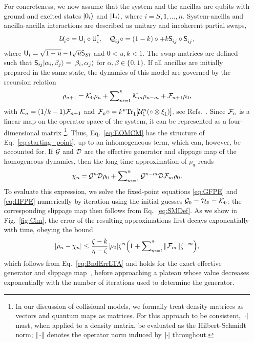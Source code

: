 \documentclass[aps,prl,reprint]{revtex4-2}
\begin{document}
For concreteness, we now assume that the system and the ancillas are qubits with ground and excited states $\lvert 0_i \rangle$ and $\lvert 1_i \rangle$, where $i=S,1,\dots,n$.
System-ancilla and ancilla-ancilla interactions are described as unitary and incoherent partial swaps,
\begin{equation}
	\mathcal{U}_i^{\vphantom{\dagger}}\circ = \mathsf{U}_i^{\vphantom{\dagger}}\circ\mathsf{U}_i^\dagger, \quad
	\mathcal{Q}_{ij}^{\vphantom{\dagger}}\circ= (1-k)\circ
		+ k\mathsf{S}_{ij}^{\vphantom{\dagger}}\circ\mathsf{S}_{ij}^{\vphantom{\dagger}},
\end{equation}
where $\mathsf{U}_i = \sqrt{1-u} - \mathrm{i} \sqrt{u}\mathsf{S}_{Si}$ and $0<u,k<1$.
The swap matrices are defined such that $\mathsf{S}_{ij}\lvert \alpha_i,\beta_j \rangle = \lvert \beta_i,\alpha_j \rangle$ for $\alpha,\beta\in\{0,1\}$.
If all ancillas are initially prepared in the same state, the dynamics of this model are governed by the recursion relation
\begin{equation}\label{eq:EOMCM}
	\rho_{n+1} = \mathcal{K}_0 \rho_n + \sum\nolimits_{m=1}^n \mathcal{K}_{m}\rho_{n-m} + \mathcal{F}_{n+1}\rho_0,
\end{equation}
with $\mathcal{K}_n = (1/k-1)\mathcal{F}_{n+1}$ and $\mathcal{F}_n\circ = k^n\mathrm{Tr}_1^{\vphantom{n}}[\mathcal{U}^n_1(\circ\otimes\xi_1^{\vphantom{n}})]$, see Refs.~\cite{meyerWeakMemoryDynamicsDiscrete2025,ciccarelloQuantumCollisionModels2022}.
Since $\mathcal{F}_n$ is a linear map on the operator space of the system, it can be represented as a four-dimensional matrix \footnote{In our discussion of collisional models, we formally treat density matrices as vectors and quantum maps as matrices.
For this approach to be consistent, $\lvert \cdot \rvert$ must, when applied to a density matrix, be evaluated as the Hilbert-Schmidt norm; $\lVert \cdot \rVert$ denotes the operator norm induced by $\lvert \cdot \rvert$ throughout.}.
Thus, Eq.~\eqref{eq:EOMCM} has the structure of Eq.~\eqref{eq:starting_point}, up to an inhomogeneous term, which can, however, be accounted for.
If $\mathcal{G}$ and $\mathcal{D}$ are the effective generator and slippage map of the homogeneous dynamics, then the long-time approximation of $\rho_n$ reads~\cite{meyerWeakMemoryDynamicsDiscrete2025}
\begin{equation}\label{eq:LTACM}
	\chi_n = \mathcal{G}^n\mathcal{D}\rho_0 + \sum\nolimits_{m=1}^n\mathcal{G}^{n-m}\mathcal{D}\mathcal{F}_m\rho_0.
\end{equation}
To evaluate this expression, we solve the fixed-point equations \eqref{eq:GFPE} and \eqref{eq:HFPE} numerically by iteration using the initial guesses $\mathcal{G}_0 = \mathcal{H}_0 = \mathcal{K}_0$; the corresponding slippage map then follows from Eq.~\eqref{eq:SMDef}.
As we show in Fig.~\ref{fig:Clm}, the error of the resulting approximations first decays exponentially with time, obeying the bound
\begin{equation}\label{eq:BndLTACM}
	\lvert \rho_n-\chi_n \rvert\leq \frac{\zeta-k}{\eta-\zeta}\lvert \rho_0 \rvert
		\zeta^n\Bigl(1 + \sum\nolimits_{m=1}^n \lVert \mathcal{F}_m \rVert\zeta^{-m}\Bigr),
\end{equation}
which follows from Eq.~\eqref{eq:BndErrLTA} and holds for the exact effective generator and slippage map~\cite{meyerWeakMemoryDynamicsDiscrete2025}, before approaching a plateau whose value decreases exponentially with the number of iterations used to determine the generator.
\end{document}
